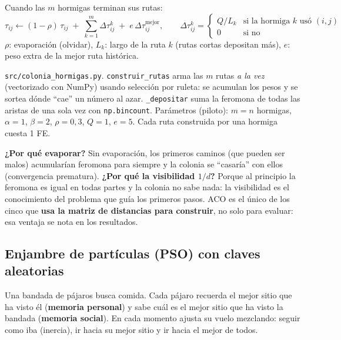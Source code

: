 \documentclass[11pt,a4paper]{article}
\newcommand{\archivo}[1]{\texttt{#1}}
\begin{document}
\begin{mate}
Cuando las $m$ hormigas terminan sus rutas:
\[
\tau_{ij}\leftarrow(1-\rho)\,\tau_{ij}\;+\;\sum_{k=1}^{m}\Delta\tau_{ij}^{k}\;+\;e\,\Delta\tau_{ij}^{\text{mejor}},
\qquad
\Delta\tau_{ij}^{k}=\begin{cases}Q/L_k & \text{si la hormiga }k\text{ usó }(i,j)\\0&\text{si no}\end{cases}
\]
$\rho$: evaporación (olvidar), $L_k$: largo de la ruta $k$ (rutas cortas depositan más), $e$: peso extra de la mejor ruta histórica.
\end{mate}

\begin{codigo}
\archivo{src/colonia\_hormigas.py}. \texttt{construir\_rutas} arma las $m$ rutas \emph{a la vez} (vectorizado con NumPy) usando
selección por ruleta: se acumulan los pesos y se sortea dónde ``cae'' un número al azar. \texttt{\_depositar} suma la feromona
de todas las aristas de una sola vez con \texttt{np.bincount}. Parámetros (piloto): $m=n$ hormigas, $\alpha=1$, $\beta=2$, $\rho=0{,}3$, $Q=1$, $e=5$.
Cada ruta construida por una hormiga cuesta 1 FE.
\end{codigo}

\begin{porque}
\textbf{¿Por qué evaporar?} Sin evaporación, los primeros caminos (que pueden ser malos) acumularían feromona para siempre y la colonia
se ``casaría'' con ellos (convergencia prematura). \textbf{¿Por qué la visibilidad $1/d$?} Porque al principio la feromona es igual en todas
partes y la colonia no sabe nada: la visibilidad es el conocimiento del problema que guía los primeros pasos.
ACO es el único de los cinco que \textbf{usa la matriz de distancias para construir}, no solo para evaluar: esa ventaja se nota en los resultados.
\end{porque}

\subsection{Enjambre de partículas (PSO) con claves aleatorias}
\begin{idea}
Una bandada de pájaros busca comida. Cada pájaro recuerda el mejor sitio que ha visto él (\textbf{memoria personal}) y sabe cuál es
el mejor sitio que ha visto la bandada (\textbf{memoria social}). En cada momento ajusta su vuelo mezclando: seguir como iba (inercia),
ir hacia su mejor sitio y ir hacia el mejor de todos.
\end{idea}
\end{document}
